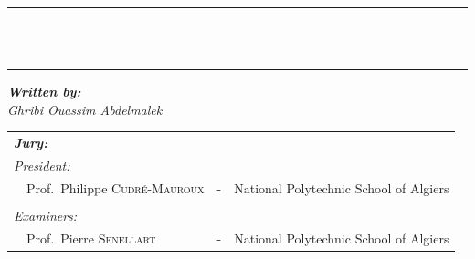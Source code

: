 {\begin{titlepage}
    \vspace{5mm}

    \center


    \vspace{2mm}


    \vspace{2mm}


    \vspace{5mm}

    \begin{bfseries}
        \rule{\linewidth}{1pt} \\
        \vspace{5mm}
         \\
        \vspace{5mm}
        \rule{\linewidth}{1pt}
    \end{bfseries}

    \begin{flushleft}
        \textit{\textbf{Written by:}}      \\
        \textit{Ghribi Ouassim Abdelmalek} \\
    \end{flushleft}

    \begin{center}
        \noindent \large
        \begin{tabular}{llcl}
            \textit{\textbf{Jury:}}                                           &   &                                        & \\
            \textit{President:}                                               &   &                                        & \\
            \multicolumn{2}{l}{~~Prof.\  Philippe \textsc{Cudr\'{e}-Mauroux}} & - & National Polytechnic School of Algiers   \\

            \\
            \textit{Examiners:}                                               &   &                                        & \\
            \multicolumn{2}{l}{~~Prof.\ Pierre \textsc{Senellart}}            & - & National Polytechnic School of Algiers   \\


\end{tabular}
\end{center}
\end{titlepage}}
